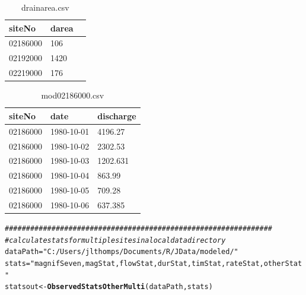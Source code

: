 \documentclass[a4paper,11pt]{article}\usepackage[]{graphicx}\usepackage[]{color}
\makeatletter
\newcommand{\hlstr}[1]{\textcolor[rgb]{0.192,0.494,0.8}{#1}}%
\newcommand{\hlcom}[1]{\textcolor[rgb]{0.678,0.584,0.686}{\textit{#1}}}%
\newcommand{\hlstd}[1]{\textcolor[rgb]{0.345,0.345,0.345}{#1}}%
\newcommand{\hlkwb}[1]{\textcolor[rgb]{0.69,0.353,0.396}{#1}}%
\newcommand{\hlkwd}[1]{\textcolor[rgb]{0.737,0.353,0.396}{\textbf{#1}}}%
\newenvironment{kframe}{%
 \def\at@end@of@kframe{}%
 \ifinner\ifhmode%
  \def\at@end@of@kframe{\end{minipage}}%
  \begin{minipage}{\columnwidth}%
 \fi\fi%
 \def\FrameCommand##1{\hskip\@totalleftmargin \hskip-\fboxsep
 \colorbox{shadecolor}{##1}\hskip-\fboxsep
     \hskip-\linewidth \hskip-\@totalleftmargin \hskip\columnwidth}%
 \MakeFramed {\advance\hsize-\width
   \@totalleftmargin\z@ \linewidth\hsize
   \@setminipage}}%
 {\par\unskip\endMakeFramed%
 \at@end@of@kframe}
\newenvironment{knitrout}{}{} %
\makeatother
\begin{document}
\begin{table}[ht]
  \centering
  \begin{threeparttable}[b]
  \caption{drainarea.csv}
  \label{tab:darea}
  \begin{tabularx}{\textwidth}{lXl}
  \hline
\textbf{siteNo} & \textbf{darea} \\ 
  \hline
  02186000 & 106 \\
  02192000 & 1420 \\
  02219000 & 176 \\
  \hline
  \end{tabularx}
  \end{threeparttable}
\end{table}

\begin{table}[ht]
  \centering
  \begin{threeparttable}[b]
  \caption{mod02186000.csv}
  \label{tab:moddata}
  \begin{tabularx}{\textwidth}{lXl}
  \hline
\textbf{siteNo} & \textbf{date} & \textbf{discharge} \\ 
  \hline
  02186000 & 1980-10-01 & 4196.27 \\
  02186000 & 1980-10-02 & 2302.53 \\
  02186000 & 1980-10-03 & 1202.631 \\
  02186000 & 1980-10-04 & 863.99 \\
  02186000 & 1980-10-05 & 709.28 \\
  02186000 & 1980-10-06 & 637.385 \\
  \hline
  \end{tabularx}
  \end{threeparttable}
\end{table}

\begin{knitrout}
\color{fgcolor}\begin{kframe}
\begin{alltt}
\hlcom{###############################################################}
\hlcom{# calculate stats for multiple sites in a local data directory}
\hlstd{dataPath}\hlkwb{=}\hlstr{"C:/Users/jlthomps/Documents/R/JData/modeled/"}
\hlstd{stats}\hlkwb{=}\hlstr{"magnifSeven,magStat,flowStat,durStat,timStat,rateStat,otherStat"}
\hlstd{statsout} \hlkwb{<-} \hlkwd{ObservedStatsOtherMulti}\hlstd{(dataPath,stats)}
\end{alltt}
\end{kframe}
\end{knitrout}
\end{document}
